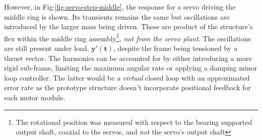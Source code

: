 \par
However, in Fig:\ref{fig:servo-step-middle}, the response for a servo driving the middle ring is shown. Its transients remains the same but oscillations are introduced by the larger mass being driven. These are product of the structure's flex within the middle ring assembly\footnote{The rotational position was measured with respect to the bearing supported output shaft, coaxial to the servos, and \emph{not} the servo's output shaft}, \emph{not from the servo plant}. The oscillations are still present under load, {\color{Red}$\mathbf{y'(t)}$}, despite the frame being tensioned by a thrust vector. The harmonics can be accounted for by either introducing a more rigid sub-frame, limiting the maximum angular rate or applying a damping minor loop controller. The latter would be a \emph{virtual} closed loop with an approximated error rate as the prototype structure doesn't incorporate positional feedback for each motor module.
